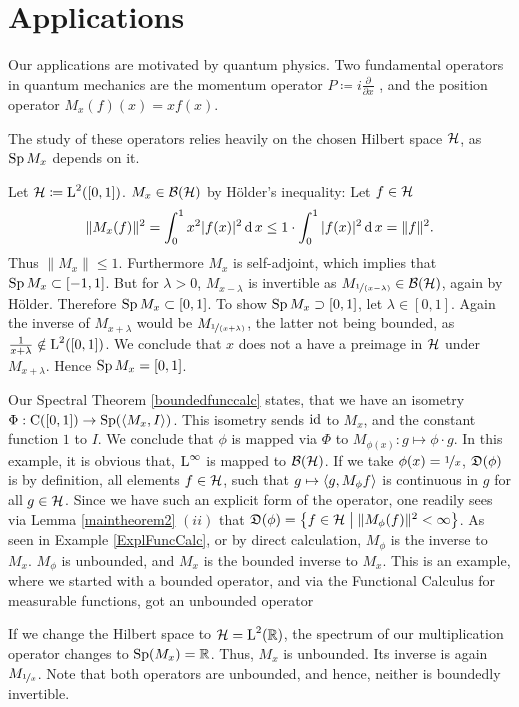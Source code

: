 \section{Applications}

Our applications are motivated by quantum physics. Two fundamental operators
in quantum mechanics are the momentum operator $P\coloneqq 
i \frac{\partial}{\partial x}$
, and the position operator $M_x(f)(x) = xf(x)$. 

\begin{rem}
The study of these operators relies heavily on the chosen Hilbert space $\mathcal{H}$, 
as $\operatorname{Sp} M_x$ depends on it.
\end{rem}
\begin{expl}\label{ExplMult}
 

Let $\mathcal{H} \coloneqq \text{L}^2(\left[ 0, 1 \right])$. $M_x \in \mathcal{B}(\mathcal{H})$ by Hölder's 
inequality: Let $f \in \mathcal{H}$
\[
 \| M_x(f) \|^2 = \int _0 ^1 x^2 | f(x)|^2 \operatorname{d} x \leq 
 1 \cdot \int _0 ^1 | f(x) |^2 \operatorname{d} x = \| f \| ^2.
\]
Thus $\| M_x\| \leq 1$. Furthermore $M_x$ is self-adjoint, which implies that
$\operatorname{Sp} M_x \subset \left[ -1 , 1 \right]$. But for $\lambda > 0$,
$M_{x-\lambda}$ is invertible as $M_{\nicefrac{1}{(x - \lambda)}} \in \mathcal{B}(\mathcal{H})$, again by
Hölder. Therefore $\operatorname{Sp} M_x \subset \left[ 0, 1\right]$. To show 
$\operatorname{Sp} M_x \supset \left[ 0, 1\right]$, let $\lambda \in  \left[ 0, 1\right]$.
Again the inverse of $M_{x+ \lambda}$ would be $M_{\nicefrac{1}{(x + \lambda)}}$,
the latter not being bounded, as $\frac{1}{x + \lambda} \notin 
\text{L}^2(\left[ 0, 1\right])$. We conclude that $x$ does not a have a preimage
in $\mathcal{H}$ under $M_{x + \lambda}$. Hence $\operatorname{Sp} M_x = \left[ 0 , 1\right]$.

Our Spectral Theorem \ref{boundedfunccalc} states, that we have
an isometry $\Phi : \operatorname{C}(\left[0, 1\right]) \to \operatorname{Sp} (\left\langle M_x, I \right\rangle)$. This 
isometry sends $\operatorname{id}$ to $M_x$, and the constant function $1$ to $I$.
We conclude that $\phi$ is mapped via $\Phi$ to 
$M_{\phi(x)}: g \mapsto \phi \cdot g$. In this example, it is obvious that,
$\text{L}^\infty$ is mapped to $\mathcal{B}(\mathcal{H})$. If we take $\phi(x) = \nicefrac{1}{x}$, 
$\mathfrak{D}(\phi)$ is by definition, all elements $f \in \mathcal{H}$, such that
$g \mapsto \left\langle g, M_\phi f \right\rangle$ is continuous in $g$ for all $g \in \mathcal{H}$.
Since we have such an explicit form of the operator, one readily sees via 
Lemma \ref{maintheorem2} $(ii)$ that
$\mathfrak{D}(\phi) = \left\lbrace f \in \mathcal{H} \bigm | \|M_\phi (f)\|^2 < \infty \right\rbrace$.
As seen in Example \ref{ExplFuncCalc}, or by direct calculation, 
$M_\phi$ is the inverse to $M_x$. $M_\phi$ is unbounded, and $M_x$ is 
the bounded inverse to $M_x$. This is an example, where we started with
a bounded operator, and via the Functional Calculus for measurable 
functions, got an unbounded operator

If we change the Hilbert space to $\mathcal{H} = \text{L}^2 (\mathbb{R})$, the spectrum
of our multiplication operator changes to $\operatorname{Sp}(M_x) = \mathbb{R}$. Thus, $M_x$ 
is unbounded. Its inverse is again $M_{\nicefrac{1}{x}}$. Note that 
both operators are unbounded, and hence, neither is boundedly invertible.
\end{expl}

